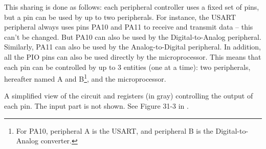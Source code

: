 This sharing is done as follows: each peripheral controller uses a fixed set of
pins, but a pin can be used by up to two peripherals. For instance, the USART
peripheral always uses pins PA10 and PA11 to receive and transmit data -- this
can't be changed. But PA10 can also be used by the Digital-to-Analog
peripheral. Similarly, PA11 can also be used by the Analog-to-Digital
peripheral. In addition, all the PIO pins can also be used directly by the
microprocessor. This means that each pin can be controlled by up to 3 entities
(one at a time): two peripherals, hereafter named A and B\footnote{For PA10,
peripheral A is the USART, and peripheral B is the Digital-to-Analog
converter.}, and the microprocessor.

\begin{Figure}
  
  \caption{A simplified view of the circuit and registers (in gray) controlling
  the output of each pin. The input part is not shown. See Figure 31-3 in
  \cite{SAM3X8E}.}\label{fig:pio-controller}
\end{Figure}

